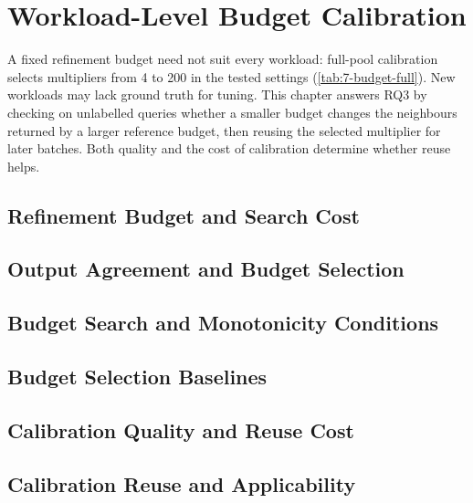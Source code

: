 \chapter{Workload-Level Budget Calibration}
\label{ch:refinement}
A fixed refinement budget need not suit every workload: full-pool
calibration selects multipliers from 4 to 200 in the tested settings
(\cref{tab:7-budget-full}). New workloads may lack ground truth for
tuning. This chapter answers RQ3 by checking on unlabelled queries
whether a smaller budget changes the neighbours returned by a larger
reference budget, then reusing the selected multiplier for later batches.
Both quality and the cost of calibration determine whether reuse helps.

\section{Refinement Budget and Search Cost}
\label{sec:6-1}


\section{Output Agreement and Budget Selection}
\label{sec:6-2}


\section{Budget Search and Monotonicity Conditions}
\label{sec:6-3}


\section{Budget Selection Baselines}
\label{sec:6-4}


\section{Calibration Quality and Reuse Cost}
\label{sec:6-5}
\enlargethispage{2\baselineskip}


\par\medskip\noindent\begin{minipage}{\linewidth}
\setlength{\parindent}{1.2em}
\section{Calibration Reuse and Applicability}
\label{sec:6-6}

\end{minipage}\par
